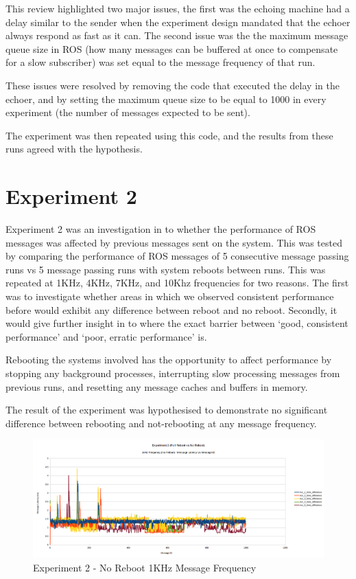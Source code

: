 \documentclass{l4proj}
\begin{document}
This review highlighted two major issues, the first was the echoing machine had a delay similar to the sender when the experiment design mandated that the echoer always respond as fast as it can. The second issue was the the maximum message queue size in ROS (how many messages can be buffered at once to compensate for a slow subscriber) was set equal to the message frequency of that run.

These issues were resolved by removing the code that executed the delay in the echoer, and by setting the maximum queue size to be equal to 1000 in every experiment (the number of messages expected to be sent).

The experiment was then repeated using this code, and the results from these runs agreed with the hypothesis.

\chapter{Experiment 2}

Experiment 2 was an investigation in to whether the performance of ROS messages was affected by previous messages sent on the system. This was tested by comparing the performance of ROS messages of 5 consecutive message passing runs vs 5 message passing runs with system reboots between runs. This was repeated at 1KHz, 4KHz, 7KHz, and 10Khz frequencies for two reasons. The first was to investigate whether areas in which we observed consistent performance before would exhibit any difference between reboot and no reboot. Secondly, it would give further insight in to where the exact barrier between `good, consistent performance' and `poor, erratic performance' is.

Rebooting the systems involved has the opportunity to affect performance by stopping any background processes, interrupting slow processing messages from previous runs, and resetting any message caches and buffers in memory.

The result of the experiment was hypothesised to demonstrate no significant difference between rebooting and not-rebooting at any message frequency.

\begin{figure}[h]
\centering
\includegraphics[width=\textwidth]{images/no-reboot-1khz.png}
\caption{Experiment 2 - No Reboot 1KHz Message Frequency}
\label{exp2-noreboot-1khz}
\end{figure}
\end{document}

